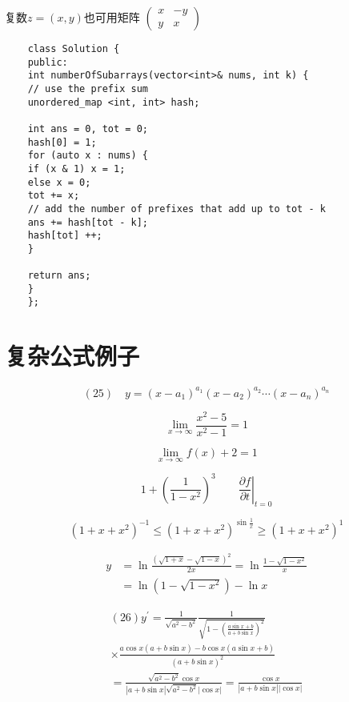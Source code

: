 \documentclass{article}
\begin{document}
    复数$z = (x, y)$也可用矩阵 
    \begin{math}
    \left(\begin{smallmatrix}
    x & -y \\
    y & x   
    \end{smallmatrix}\right) %
    \end{math}

    \begin{verbatim}
    class Solution {
    public:
    int numberOfSubarrays(vector<int>& nums, int k) {
    // use the prefix sum
    unordered_map <int, int> hash;

    int ans = 0, tot = 0;
    hash[0] = 1;
    for (auto x : nums) {
    if (x & 1) x = 1;
    else x = 0;
    tot += x;
    // add the number of prefixes that add up to tot - k
    ans += hash[tot - k]; 
    hash[tot] ++;
    }

    return ans;
    }
    };

    \end{verbatim}


    \section{复杂公式例子}
    \[
    (25)\quad y=\left(x-a_{1}\right)^{a_{1}}\left(x-a_{2}\right)^{a_{2}} \cdots\left(x-a_{n}\right)^{a_{n}}
    \]

    \[
    \lim _{x \rightarrow \infty} \frac{x^{2}-5}{x^{2}-1}=1
    \]

    $$\lim _{x \rightarrow \infty} {f(x)+ 2} = 1$$

    \[
    1 + \left(\frac{1}{1-x^{2}}\right)^3 \qquad
    \left. \frac{\partial f}{\partial t}
    \right|_{t = 0}
    \]

    \[(1 + x + x^2)^{-1} \leqslant (1 + x + x^2)^{\sin\frac{1}{x}} \geqslant (1+x+x^2)^{1}\] %

    \[
    \begin{aligned} y &=\ln \frac{(\sqrt{1+x}-\sqrt{1-x})^{2}}{2 x}=\ln \frac{1-\sqrt{1-x^{2}}}{x} \\ &=\ln (1-\sqrt{1-x^{2}})-\ln x \end{aligned}
    \]


    \[
    \begin{array}{l}{(26) y^{\prime}=\frac{1}{\sqrt{a^{2}-b^{2}}} \frac{1}{\sqrt{1-\left(\frac{a \sin x+b}{a+b \sin x}\right)^{2}}}} \\ {\times \frac{a \cos x(a+b \sin x)-b \cos x(a \sin x+b)}{(a+b \sin x)^{2}}} \\ {=\frac{\sqrt{a^{2}-b^{2}} \cos x}{|a+b \sin x| \sqrt{a^{2}-b^{2}}|\cos x|}=\frac{\cos x}{|a+b \sin x||\cos x|}}\end{array}
    \]
\end{document}

